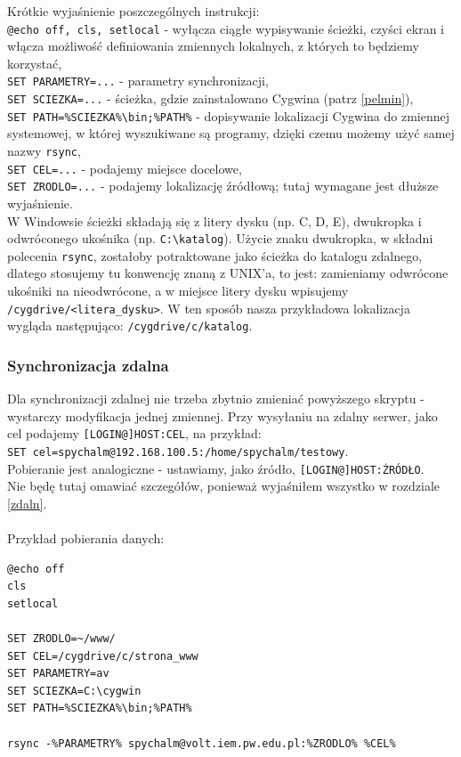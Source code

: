 \noindent
Krótkie wyjaśnienie poszczególnych instrukcji:\\
\verb|@echo off, cls, setlocal| - wyłącza ciągłe wypisywanie ścieżki, czyści ekran i włącza możliwość definiowania zmiennych lokalnych, z których to będziemy korzystać,\\
\verb|SET PARAMETRY=...| - parametry synchronizacji,\\
\verb|SET SCIEZKA=...| - ścieżka, gdzie zainstalowano Cygwina (patrz \ref{pelmin}),\\
\verb|SET PATH=%SCIEZKA%\bin;%PATH%| - dopisywanie lokalizacji Cygwina do zmiennej systemowej, w której wyszukiwane są programy, dzięki czemu możemy użyć samej nazwy \verb|rsync|,\\
\verb|SET CEL=...| - podajemy miejsce docelowe,\\
\verb|SET ZRODLO=...| - podajemy lokalizację źródłową; tutaj wymagane jest dłuższe wyjaśnienie.\\W Windowsie ścieżki składają się z litery dysku (np. C, D, E), dwukropka i odwróconego ukośnika (np. \verb|C:\katalog|). Użycie znaku dwukropka, w składni polecenia \verb|rsync|, zostałoby potraktowane jako ścieżka do katalogu zdalnego, dlatego stosujemy tu konwencję znaną z UNIX'a, to jest: zamieniamy odwrócone ukośniki na nieodwrócone, a w miejsce litery dysku wpisujemy \verb|/cygdrive/<litera_dysku>|. W ten sposób nasza przykładowa lokalizacja wygląda następująco: \verb|/cygdrive/c/katalog|.\\

\subsubsection{Synchronizacja zdalna}
Dla synchronizacji zdalnej nie trzeba zbytnio zmieniać powyższego skryptu - wystarczy modyfikacja jednej zmiennej. Przy wysyłaniu na zdalny serwer, jako cel podajemy \verb|[LOGIN@]HOST:CEL|, na przykład: \\\verb|SET cel=spychalm@192.168.100.5:/home/spychalm/testowy|. \\
Pobieranie jest analogiczne - ustawiamy, jako źródło, \verb|[LOGIN@]HOST:ŹRÓDŁO|.
\\ Nie będę tutaj omawiać szczegółów, ponieważ wyjaśniłem wszystko w rozdziale \ref{zdaln}. 
\\\\
Przykład pobierania danych:
\begin{verbatim}
@echo off
cls
setlocal

SET ZRODLO=~/www/
SET CEL=/cygdrive/c/strona_www
SET PARAMETRY=av
SET SCIEZKA=C:\cygwin
SET PATH=%SCIEZKA%\bin;%PATH%

rsync -%PARAMETRY% spychalm@volt.iem.pw.edu.pl:%ZRODLO% %CEL%
\end{verbatim}

